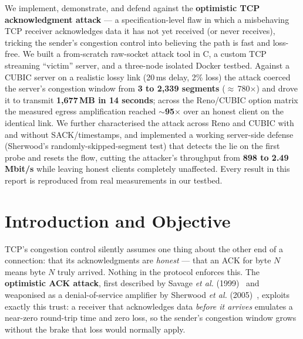 \documentclass[11pt,a4paper]{article}
\begin{document}
\thispagestyle{fancy}
\begin{tcolorbox}[colback=lightgray,colframe=navy,boxrule=1pt,arc=2pt,
  title={\bfseries Abstract},fonttitle=\color{white}\bfseries,colbacktitle=navy]
\small
We implement, demonstrate, and defend against the \textbf{optimistic TCP acknowledgment
attack} --- a specification-level flaw in which a misbehaving TCP receiver acknowledges
data it has not yet received (or never receives), tricking the sender's congestion
control into believing the path is fast and loss-free. We built a from-scratch
raw-socket attack tool in C, a custom TCP streaming ``victim'' server, and a
three-node isolated Docker testbed. Against a CUBIC server on a realistic lossy link
(20\,ms delay, 2\% loss) the attack coerced the server's congestion window from
\textbf{3 to 2{,}339 segments} ($\approx$\,780$\times$) and drove it to transmit
\textbf{1{,}677\,MB in 14 seconds}; across the Reno/CUBIC option matrix the measured
egress amplification reached \textbf{$\sim$95$\times$} over an honest client on the
identical link. We further
characterised the attack across Reno and CUBIC with and without SACK/timestamps, and
implemented a working server-side defense (Sherwood's randomly-skipped-segment test)
that detects the lie on the first probe and resets the flow, cutting the attacker's
throughput from \textbf{898 to 2.49\,Mbit/s} while leaving honest clients completely
unaffected. Every result in this report is reproduced from real measurements in our
testbed.
\end{tcolorbox}

{\small\tableofcontents}
\newpage

\section{Introduction and Objective}

TCP's congestion control silently assumes one thing about the other end of a connection:
that its acknowledgments are \emph{honest} --- that an ACK for byte $N$ means byte $N$
truly arrived. Nothing in the protocol enforces this. The \textbf{optimistic ACK attack},
first described by Savage \textit{et al.} (1999)~\cite{savage} and weaponised as a
denial-of-service amplifier by Sherwood \textit{et al.} (2005)~\cite{sherwood}, exploits
exactly this trust: a receiver that acknowledges data \emph{before it arrives} emulates a
near-zero round-trip time and zero loss, so the sender's congestion window grows without
the brake that loss would normally apply.
\end{document}
